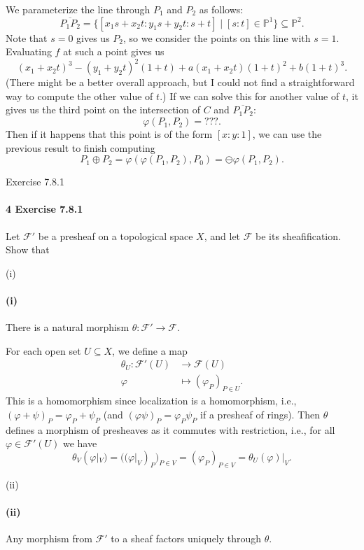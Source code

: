 \documentclass[12pt]{article}
\newlength{\myparskip}
\newenvironment{fullbox}{\begin{lrbox}{\savefullbox}\begin{minipage}{\dimexpr\textwidth-2\fboxsep\relax}\setlength{\parskip}{\myparskip}}{\end{minipage}\end{lrbox}\framebox[\textwidth]{\usebox{\savefullbox}}}
\newenvironment{pbox}[1][]{\begin{fullbox}\ifx#1\empty\else\paragraph{#1}\phantom{}\fi}{\end{fullbox}}
\theoremstyle{definition}
\renewcommand{\P}{\mathbb{P}}
\renewcommand{\phi}{\varphi}
\newcommand{\<}{\langle}
\renewcommand{\>}{\rangle}
\newcommand{\seq}{\subseteq}
\newcommand{\FF}{\mathcal{F}}
\begin{document}
We parameterize the line through $P_1$ and $P_2$ as follows:
\[
    \overline{P_1P_2} = \{[x_1s + x_2t : y_1s + y_2t : s + t] \mid [s : t] \in \P^1\} \seq \P^2.
\]
Note that $s = 0$ gives us $P_2$, so we consider the points on this line with $s = 1$.
Evaluating $f$ at such a point gives us
\[
    (x_1 + x_2t)^3 - (y_1 + y_2t)^2(1 + t) + a(x_1 + x_2t)(1 + t)^2 + b(1 + t)^3.
\]
(There might be a better overall approach, but I could not find a straightforward way to compute the other value of $t$.)
If we can solve this for another value of $t$, it gives us the third point on the intersection of $C$ and $\overline{P_1P_2}$:
\[
    \phi(P_1, P_2) = ???.
\]
Then if it happens that this point is of the form $[x : y : 1]$, we can use the previous result to finish computing
\[
    P_1 \oplus P_2
        = \phi(\phi(P_1, P_2), P_0)
        = \ominus \phi(P_1, P_2).
\]




\newpage
\begin{pbox}[4 Exercise 7.8.1]
    Let $\FF'$ be a presheaf on a topological space $X$, and let $\FF$ be its sheafification.
    Show that
\end{pbox}

\begin{pbox}[(i)]
    There is a natural morphism $\theta: \FF' \to \FF$.    
\end{pbox}

For each open set $U \seq X$, we define a map
\begin{align*}
    \theta_U : \FF'(U) &\longrightarrow \FF(U) \\
        \phi &\longmapsto (\phi_P)_{P \in U}.
\end{align*}
This is a homomorphism since localization is a homomorphism, i.e., $(\phi + \psi)_P = \phi_P + \psi_P$ (and $(\phi\psi)_P = \phi_P \psi_P$ if a presheaf of rings).
Then $\theta$ defines a morphism of presheaves as it commutes with restriction, i.e., for all $\phi \in \FF'(U)$ we have
\[
    \theta_V(\phi|_V)
        = ((\phi|_V)_P)_{P \in V}
        = (\phi_P)_{P \in V}
        = \theta_U(\phi)|_V.
\]

\begin{pbox}[(ii)]
    Any morphism from $\FF'$ to a sheaf factors uniquely through $\theta$.
\end{pbox}
\end{document}
